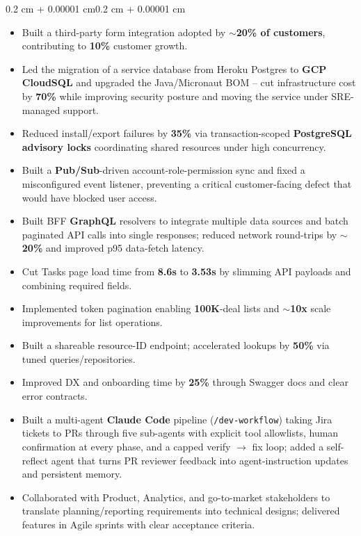 \documentclass[10pt]{article}
\newenvironment{highlights}{
    \begin{itemize}[leftmargin=15pt, topsep=1pt, itemsep=1pt]
}{
    \end{itemize}
}
\newenvironment{onecolentry}{
    \begin{adjustwidth}{0.2 cm + 0.00001 cm}{0.2 cm + 0.00001 cm}
}{
    \end{adjustwidth}
}
\begin{document}
        \vspace{0.10 cm}
        \begin{onecolentry}
            \begin{highlights}
                \item Built a third-party form integration adopted by \textbf{$\sim$20\% of customers}, contributing to \textbf{10\%} customer growth.
                \item Led the migration of a service database from Heroku Postgres to \textbf{GCP CloudSQL} and upgraded the Java/Micronaut BOM -- cut infrastructure cost by \textbf{70\%} while improving security posture and moving the service under SRE-managed support.
                \item Reduced install/export failures by \textbf{35\%} via transaction-scoped \textbf{PostgreSQL advisory locks} coordinating shared resources under high concurrency.
                \item Built a \textbf{Pub/Sub}-driven account-role-permission sync and fixed a misconfigured event listener, preventing a critical customer-facing defect that would have blocked user access.
                \item Built BFF \textbf{GraphQL} resolvers to integrate multiple data sources and batch paginated API calls into single responses; reduced network round-trips by \textbf{$\sim$20\%} and improved p95 data-fetch latency.
                \item Cut Tasks page load time from \textbf{8.6s} to \textbf{3.53s} by slimming API payloads and combining required fields.
                \item Implemented token pagination enabling \textbf{100K}-deal lists and \textbf{$\sim$10x} scale improvements for list operations.
                \item Built a shareable resource-ID endpoint; accelerated lookups by \textbf{50\%} via tuned queries/repositories.
                \item Improved DX and onboarding time by \textbf{25\%} through Swagger docs and clear error contracts.
                \item Built a multi-agent \textbf{Claude Code} pipeline (\texttt{/dev-workflow}) taking Jira tickets to PRs through five sub-agents with explicit tool allowlists, human confirmation at every phase, and a capped verify $\to$ fix loop; added a self-reflect agent that turns PR reviewer feedback into agent-instruction updates and persistent memory.
                \item Collaborated with Product, Analytics, and go-to-market stakeholders to translate planning/reporting requirements into technical designs; delivered features in Agile sprints with clear acceptance criteria.
            \end{highlights}
        \end{onecolentry}
\end{document}
